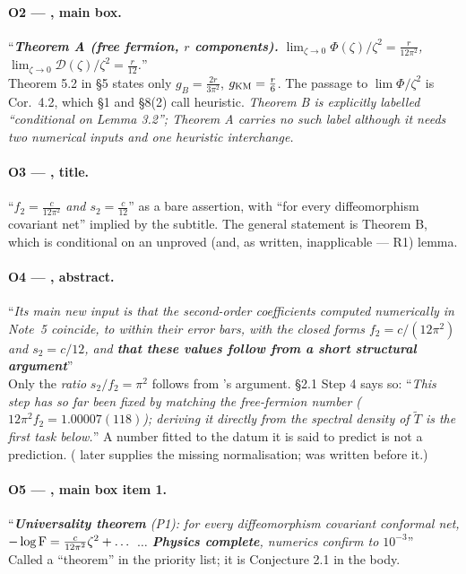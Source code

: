 \documentclass[11pt]{article}
\newcommand{\zz}{\zeta}
\begin{document}
\paragraph{O2 --- \NVII, main box. }
``\emph{\textbf{Theorem A (free fermion, $r$ components).} $\lim_{\zz\to0}\Phi(\zz)/\zz^2=\frac r{12\pi^2}$,
$\lim_{\zz\to0}\mathcal D(\zz)/\zz^2=\frac r{12}$.}''\\
Theorem 5.2 in \S5 states only $g_B=\frac{2r}{3\pi^2}$, $g_{\rm KM}=\frac r6$.  The passage to
$\lim\Phi/\zz^2$ is \NV{} Cor.~4.2, which \NVII{} \S1 and \S8(2) call heuristic.  \emph{Theorem B is explicitly
labelled ``conditional on Lemma 3.2''; Theorem A carries no such label although it needs two numerical inputs and one
heuristic interchange.}

\paragraph{O3 --- \NVII, title. \normalfont[GAP]}
``\emph{$f_2=\frac c{12\pi^2}$ and $s_2=\frac c{12}$}'' as a bare assertion, with ``for every diffeomorphism covariant
net'' implied by the subtitle.  The general statement is Theorem B, which is conditional on an unproved (and, as
written, inapplicable --- R1) lemma.

\paragraph{O4 --- \NVI, abstract. }
``\emph{Its main new input is that the second-order coefficients computed numerically in Note~5 coincide, to within
their error bars, with the closed forms $f_2=c/(12\pi^2)$ and $s_2=c/12$, and \textbf{that these values follow from a
short structural argument}}''\\
Only the \emph{ratio} $s_2/f_2=\pi^2$ follows from \NVI's argument.  \NVI{} \S2.1 Step 4 says so:
``\emph{This step has so far been fixed by matching the free-fermion number ($12\pi^2f_2=1.00007(118)$); deriving it
directly from the spectral density of $\widetilde T$ is the first task below.}''  A number fitted to the datum it is
said to predict is not a prediction.  (\NVII{} later supplies the missing normalisation; \NVI{} was written before it.)

\paragraph{O5 --- \NVI, main box item 1. \normalfont[GAP]}
``\emph{\textbf{Universality theorem} (P1): for every diffeomorphism covariant conformal net,
$-\log\Fid=\frac c{12\pi^2}\zz^2+\dots$ $\dots$ \textbf{Physics complete}, numerics confirm to $10^{-3}$}''\\
Called a ``theorem'' in the priority list; it is Conjecture 2.1 in the body.
\end{document}
